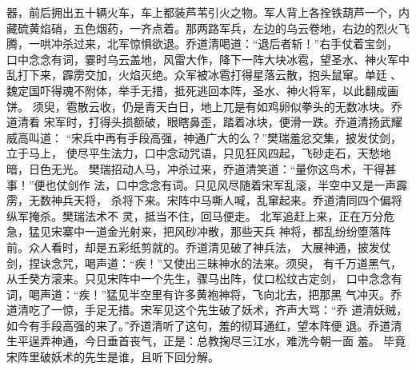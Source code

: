 器，前后拥出五十辆火车，车上都装芦苇引火之物。军人背上各拴铁葫芦一个，内
藏硫黄焰硝，五色烟药，一齐点着。那两路军兵，左边的乌云卷地，右边的烈火飞
腾，一哄冲杀过来，北军惊惧欲退。乔道清喝道：“退后者斩！”右手仗着宝剑，
口中念念有词，霎时乌云盖地，风雷大作，降下一阵大块冰雹，望圣水、神火军中
乱打下来，霹雳交加，火焰灭绝。众军被冰雹打得星落云散，抱头鼠窜。单廷、
魏定国吓得魂不附体，举手无措，抵死逃回本阵，圣水、神火将军，以此翻成画饼。
须臾，雹散云收，仍是青天白日，地上兀是有如鸡卵似拳头的无数冰块。乔道清看
宋军时，打得头损额破，眼瞎鼻歪，踏着冰块，便滑一跌。乔道清扬武耀威高叫道：
“宋兵中再有手段高强，神通广大的么？”樊瑞羞忿交集，披发仗剑，立于马上，
使尽平生法力，口中念动咒语，只见狂风四起，飞砂走石，天愁地暗，日色无光。
樊瑞招动人马，冲杀过来，乔道清笑道：“量你这鸟术，干得甚事！”便也仗剑作
法，口中念念有词。只见风尽随着宋军乱滚，半空中又是一声霹雳，无数神兵天将，
杀将下来。宋阵中马嘶人喊，乱窜起来。乔道清同四个偏将纵军掩杀。樊瑞法术不
灵，抵当不住，回马便走。
北军追赶上来，正在万分危急，猛见宋寨中一道金光射来，把风砂冲散，那些天兵
神将，都乱纷纷堕落阵前。众人看时，却是五彩纸剪就的。乔道清见破了神兵法，
大展神通，披发仗剑，捏诀念咒，喝声道：“疾！”又使出三昧神水的法来。须臾，
有千万道黑气，从壬癸方滚来。只见宋阵中一个先生，骤马出阵，仗口松纹古定剑，
口中念念有词，喝声道：“疾！”猛见半空里有许多黄袍神将，飞向北去，把那黑
气冲灭。乔道清吃了一惊，手足无措。宋军见这个先生破了妖术，齐声大骂：“乔
道清妖贼，如今有手段高强的来了。”乔道清听了这句，羞的彻耳通红，望本阵便
退。乔道清生平逞弄神通，今日垂首丧气，正是：总教掬尽三江水，难洗今朝一面
羞。
毕竟宋阵里破妖术的先生是谁，且听下回分解。